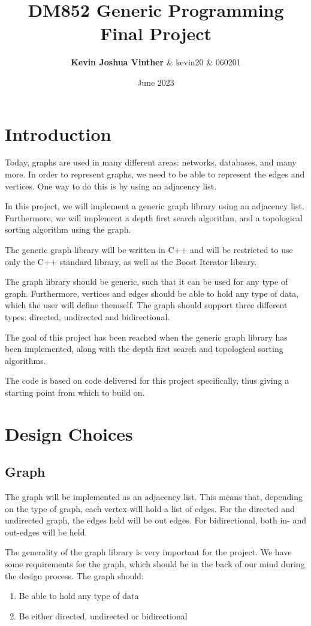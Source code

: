 \documentclass{article}
\title{DM852 Generic Programming Final Project}
\author{\textbf{Kevin Joshua Vinther} & kevin20 & 060201}
\date{June 2023}
\begin{document}
\maketitle

\section{Introduction}

Today, graphs are used in many different areas: networks, databases, and many more. In order to represent graphs, we need to be able to represent the edges and vertices. One way to do this is by using an adjacency list. 

In this project, we will implement a generic graph library using an adjacency list. Furthermore, we will implement a depth first search algorithm, and a topological sorting algorithm using the graph. 

The generic graph library will be written in C++ and will be restricted to use only the C++ standard library, as well as the Boost Iterator library.

The graph library should be generic, such that it can be used for any type of graph.
Furthermore, vertices and edges should be able to hold any type of data, which the user will define themself.
The graph should support three different types: directed, undirected and bidirectional.

The goal of this project has been reached when the generic graph library has been implemented, along with the depth first search and topological sorting algorithms.

The code is based on code delivered for this project specifically, thus giving a starting point from which to build on. 

\section{Design Choices}

\subsection{Graph}
The graph will be implemented as an adjacency list. This means that, depending on the type of graph, each vertex will hold a list of edges. For the directed and undirected graph, the edges held will be out edges. For bidirectional, both in- and out-edges will be held.

The generality of the graph library is very important for the project. 
We have some requirements for the graph, which should be in the back of our mind during the design process. 
The graph should:
\begin{enumerate}
    \item Be able to hold any type of data
    \item Be either directed, undirected or bidirectional
\end{enumerate}
\end{document}
